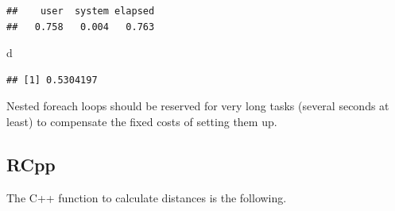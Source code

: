 \documentclass[
  12pt,
  american,
  a4paper,
  extrafontsizes,onecolumn,openright
  ]{memoir}
\newenvironment{Shaded}{\begin{snugshade}}{\end{snugshade}}
\newcommand{\NormalTok}[1]{#1}
\begin{document}
\begin{verbatim}
##    user  system elapsed 
##   0.758   0.004   0.763
\end{verbatim}

\begin{Shaded}
\begin{Highlighting}[]
\NormalTok{d}
\end{Highlighting}
\end{Shaded}

\begin{verbatim}
## [1] 0.5304197
\end{verbatim}

\normalsize

Nested foreach loops should be reserved for very long tasks (several seconds at least) to compensate the fixed costs of setting them up.

\subsection{RCpp}\label{rcpp}

The C++ function to calculate distances is the following.

\scriptsize
\end{document}

